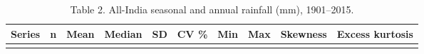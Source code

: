 \documentclass[
]{article}
\begin{document}
\begin{longtable}[]{@{}
  >{\raggedright\arraybackslash}p{}
  >{\raggedleft\arraybackslash}p{}
  >{\raggedleft\arraybackslash}p{}
  >{\raggedleft\arraybackslash}p{}
  >{\raggedleft\arraybackslash}p{}
  >{\raggedleft\arraybackslash}p{}
  >{\raggedleft\arraybackslash}p{}
  >{\raggedleft\arraybackslash}p{}
  >{\raggedleft\arraybackslash}p{}
  >{\raggedleft\arraybackslash}p{}@{}}
\caption{Table 2. All-India seasonal and annual rainfall (mm),
1901--2015.}\tabularnewline
\toprule\noalign{}
\begin{minipage}[b]{\linewidth}\raggedright
Series
\end{minipage} & \begin{minipage}[b]{\linewidth}\raggedleft
n
\end{minipage} & \begin{minipage}[b]{\linewidth}\raggedleft
Mean
\end{minipage} & \begin{minipage}[b]{\linewidth}\raggedleft
Median
\end{minipage} & \begin{minipage}[b]{\linewidth}\raggedleft
SD
\end{minipage} & \begin{minipage}[b]{\linewidth}\raggedleft
CV \%
\end{minipage} & \begin{minipage}[b]{\linewidth}\raggedleft
Min
\end{minipage} & \begin{minipage}[b]{\linewidth}\raggedleft
Max
\end{minipage} & \begin{minipage}[b]{\linewidth}\raggedleft
Skewness
\end{minipage} & \begin{minipage}[b]{\linewidth}\raggedleft
Excess kurtosis
\end{minipage} \\
\midrule\noalign{}
\endfirsthead
\toprule\noalign{}
\begin{minipage}[b]{\linewidth}\raggedright

\end{minipage}
\end{longtable}
\end{document}
